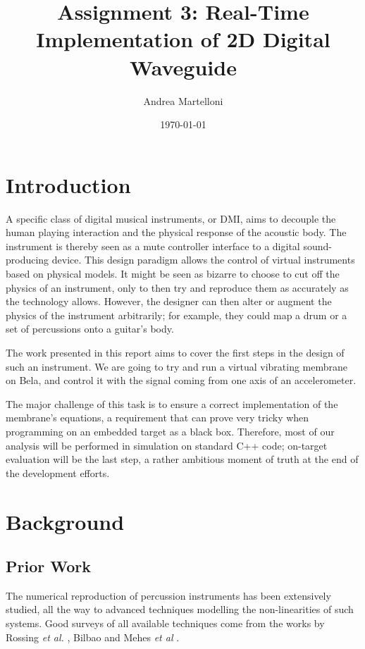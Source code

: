 \documentclass{article}
\title{Assignment 3: Real-Time Implementation of 2D
Digital Waveguide\\
[0.2em]\smaller{ECS7012P Music and Audio Programming}}
\author{Andrea Martelloni}
\date{\today}
\begin{document}
\maketitle


\section{Introduction}

A specific class of digital musical instruments, or DMI, aims to
decouple the human playing interaction and the physical response
of the acoustic body. The instrument is thereby seen as a mute
controller interface to a digital sound-producing device.
This design paradigm allows the control of virtual instruments
based on physical models. It might be seen as bizarre to choose to
cut off the physics of an instrument, only to then try and
reproduce them as accurately as the technology allows. However,
the designer can then alter or augment the physics of the
instrument arbitrarily; for example, they could map a drum
or a set of percussions onto a guitar's body.

The work presented in this report aims to cover the first steps
in the design of such an instrument. We are going to try and
run a virtual vibrating membrane on Bela, and control it with
the signal coming from one axis of an accelerometer.

The major challenge of this task is to
ensure a correct implementation of the membrane's equations,
a requirement that can prove very tricky when programming on
an embedded target as a black box. Therefore, most of our analysis
will be performed in simulation on standard C++ code; on-target
evaluation will be the last step, a rather ambitious moment
of truth at the end of the development efforts.

\section{Background}

\subsection{Prior Work}

The numerical reproduction of percussion instruments has been
extensively studied, all the way to advanced techniques
modelling the non-linearities of such systems. Good surveys of
all available techniques come from the works by
Rossing \emph{et al.} \cite{rossing2004acoustics},
Bilbao \cite{bilbao2009modular}
and Mehes \emph{et al} \cite{mehes2017virtual}.
\end{document}
